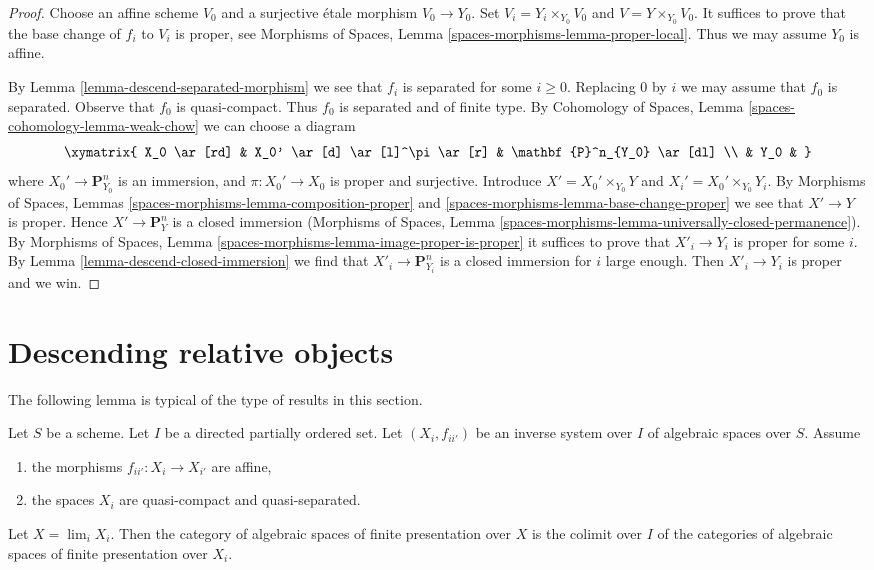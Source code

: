 \begin{proof}
Choose an affine scheme $V_0$ and a surjective \'etale morphism $V_0 \to Y_0$.
Set $V_i = Y_i \times_{Y_0} V_0$ and $V = Y \times_{Y_0} V_0$.
It suffices to prove that the base change of $f_i$ to $V_i$ is
proper, see Morphisms of Spaces, Lemma
\ref{spaces-morphisms-lemma-proper-local}.
Thus we may assume $Y_0$ is affine.

\medskip\noindent
By Lemma \ref{lemma-descend-separated-morphism} we see that
$f_i$ is separated for some $i \geq 0$. Replacing
$0$ by $i$ we may assume that $f_0$ is separated.
Observe that $f_0$ is quasi-compact. Thus $f_0$ is separated and
of finite type. By
Cohomology of Spaces, Lemma \ref{spaces-cohomology-lemma-weak-chow}
we can choose a diagram
$$
\xymatrix{
X_0 \ar[rd] & X_0' \ar[d] \ar[l]^\pi \ar[r] & \mathbf{P}^n_{Y_0} \ar[dl] \\
& Y_0 &
}
$$
where $X_0' \to \mathbf{P}^n_{Y_0}$ is an immersion, and
$\pi : X_0' \to X_0$ is proper and surjective. Introduce
$X' = X_0' \times_{Y_0} Y$ and $X_i' = X_0' \times_{Y_0} Y_i$.
By Morphisms of Spaces, Lemmas
\ref{spaces-morphisms-lemma-composition-proper} and
\ref{spaces-morphisms-lemma-base-change-proper}
we see that $X' \to Y$ is proper. Hence $X' \to \mathbf{P}^n_Y$ is
a closed immersion (Morphisms of Spaces, Lemma
\ref{spaces-morphisms-lemma-universally-closed-permanence}). By
Morphisms of Spaces, Lemma \ref{spaces-morphisms-lemma-image-proper-is-proper}
it suffices to prove that $X'_i \to Y_i$ is proper for some $i$.
By Lemma \ref{lemma-descend-closed-immersion}
we find that $X'_i \to \mathbf{P}^n_{Y_i}$ is
a closed immersion for $i$ large enough. Then $X'_i \to Y_i$
is proper and we win.
\end{proof}















\section{Descending relative objects}
\label{section-descending-relative}

\noindent
The following lemma is typical of the type of results in this section.

\begin{lemma}
\label{lemma-descend-finite-presentation}
Let $S$ be a scheme. Let $I$ be a directed partially ordered set.
Let $(X_i, f_{ii'})$ be an inverse system over $I$ of algebraic spaces
over $S$. Assume
\begin{enumerate}
\item the morphisms $f_{ii'} : X_i \to X_{i'}$ are affine,
\item the spaces $X_i$ are quasi-compact and quasi-separated.
\end{enumerate}
Let $X = \lim_i X_i$. Then the category of algebraic spaces
of finite presentation over $X$ is the colimit over $I$ of the
categories of algebraic spaces of finite presentation over $X_i$.
\end{lemma}

